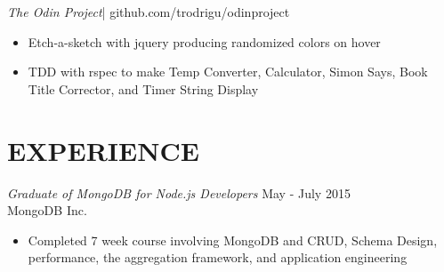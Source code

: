 \documentclass[margin]{res}
\begin{document}
\begin{resume}
  {\sl The Odin Project}|
  github.com/trodrigu/odinproject 
  \begin{itemize}
       \item Etch-a-sketch with jquery producing randomized colors on hover
       \item TDD with rspec to make Temp Converter, Calculator, Simon Says, Book Title Corrector, and Timer String Display
  \end{itemize} 

\section{EXPERIENCE} 

  {\sl Graduate of MongoDB for Node.js Developers} \hfill May - July 2015 \\
  MongoDB Inc.
  \begin{itemize}
      \item Completed 7 week course involving MongoDB and CRUD, Schema Design, performance, the aggregation framework, and application engineering
  \end{itemize}


\end{resume}
\end{document}
